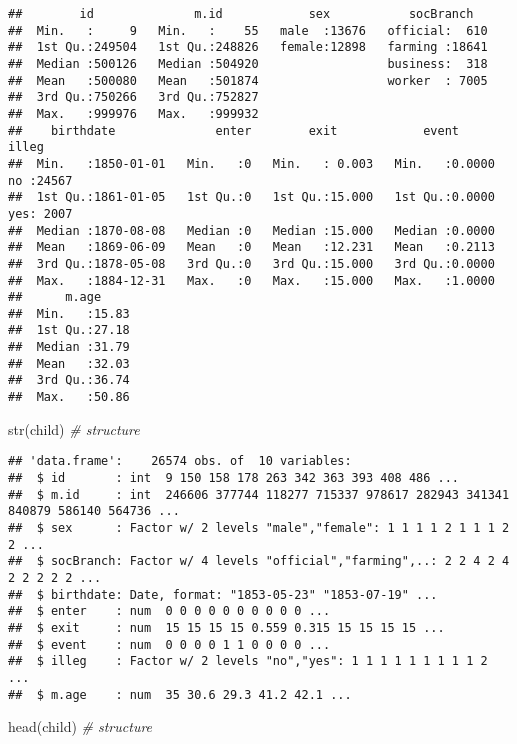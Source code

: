 \documentclass[
]{book}
\newenvironment{Shaded}{\begin{snugshade}}{\end{snugshade}}
\newcommand{\CommentTok}[1]{\textcolor[rgb]{0.56,0.35,0.01}{\textit{#1}}}
\newcommand{\FunctionTok}[1]{\textcolor[rgb]{0.00,0.00,0.00}{#1}}
\newcommand{\NormalTok}[1]{#1}
\begin{document}
\begin{verbatim}
##        id              m.id            sex           socBranch    
##  Min.   :     9   Min.   :    55   male  :13676   official:  610  
##  1st Qu.:249504   1st Qu.:248826   female:12898   farming :18641  
##  Median :500126   Median :504920                  business:  318  
##  Mean   :500080   Mean   :501874                  worker  : 7005  
##  3rd Qu.:750266   3rd Qu.:752827                                  
##  Max.   :999976   Max.   :999932                                  
##    birthdate              enter        exit            event        illeg      
##  Min.   :1850-01-01   Min.   :0   Min.   : 0.003   Min.   :0.0000   no :24567  
##  1st Qu.:1861-01-05   1st Qu.:0   1st Qu.:15.000   1st Qu.:0.0000   yes: 2007  
##  Median :1870-08-08   Median :0   Median :15.000   Median :0.0000              
##  Mean   :1869-06-09   Mean   :0   Mean   :12.231   Mean   :0.2113              
##  3rd Qu.:1878-05-08   3rd Qu.:0   3rd Qu.:15.000   3rd Qu.:0.0000              
##  Max.   :1884-12-31   Max.   :0   Max.   :15.000   Max.   :1.0000              
##      m.age      
##  Min.   :15.83  
##  1st Qu.:27.18  
##  Median :31.79  
##  Mean   :32.03  
##  3rd Qu.:36.74  
##  Max.   :50.86
\end{verbatim}

\begin{Shaded}
\begin{Highlighting}[]
\FunctionTok{str}\NormalTok{(child) }\CommentTok{\# structure}
\end{Highlighting}
\end{Shaded}

\begin{verbatim}
## 'data.frame':    26574 obs. of  10 variables:
##  $ id       : int  9 150 158 178 263 342 363 393 408 486 ...
##  $ m.id     : int  246606 377744 118277 715337 978617 282943 341341 840879 586140 564736 ...
##  $ sex      : Factor w/ 2 levels "male","female": 1 1 1 1 2 1 1 1 2 2 ...
##  $ socBranch: Factor w/ 4 levels "official","farming",..: 2 2 4 2 4 2 2 2 2 2 ...
##  $ birthdate: Date, format: "1853-05-23" "1853-07-19" ...
##  $ enter    : num  0 0 0 0 0 0 0 0 0 0 ...
##  $ exit     : num  15 15 15 15 0.559 0.315 15 15 15 15 ...
##  $ event    : num  0 0 0 0 1 1 0 0 0 0 ...
##  $ illeg    : Factor w/ 2 levels "no","yes": 1 1 1 1 1 1 1 1 1 2 ...
##  $ m.age    : num  35 30.6 29.3 41.2 42.1 ...
\end{verbatim}

\begin{Shaded}
\begin{Highlighting}[]
\FunctionTok{head}\NormalTok{(child) }\CommentTok{\# structure}
\end{Highlighting}
\end{Shaded}
\end{document}
